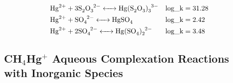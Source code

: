 \documentclass[12pt, a4paper]{article}
\begin{document}
\begin{align}
& \ce{Hg^2+ + 3 S_2O_3^2- <-> Hg(S2O3)_3^3-} && \mathrm{log\_k} = 31.28 \\
& \ce{Hg^2+ + SO_4^2- <-> HgSO4} && \mathrm{log\_k} = 2.42 \\
& \ce{Hg^2+ + 2 SO_4^2- <-> Hg(SO4)_2^2-} && \mathrm{log\_k} = 3.48
\end{align}

\subsection{CH$_4$Hg$^{+}$ Aqueous Complexation Reactions with Inorganic Species}
\end{document}

